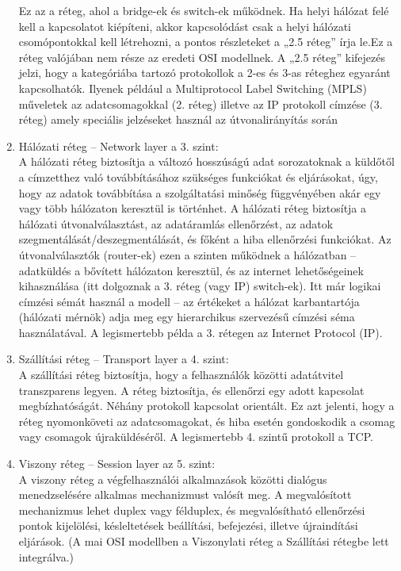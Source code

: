 \documentclass[12pt, a4paper]{article}
\begin{document}
\begin{enumerate}
Ez az a réteg, ahol a bridge-ek és switch-ek működnek. Ha helyi hálózat felé kell a kapcsolatot kiépíteni, akkor kapcsolódást csak a helyi hálózati csomópontokkal kell létrehozni, a pontos részleteket a „2.5 réteg” írja le.Ez a réteg valójában nem része az eredeti OSI modellnek. A „2.5 réteg” kifejezés jelzi, hogy a kategóriába tartozó protokollok a 2-es és 3-as réteghez egyaránt kapcsolhatók. Ilyenek például a Multiprotocol Label Switching (MPLS) műveletek az adatcsomagokkal (2. réteg) illetve az IP protokoll címzése (3. réteg) amely speciális jelzéseket használ az útvonalirányítás során
\item
Hálózati réteg – Network layer a 3. szint:\\
A hálózati réteg biztosítja a változó hosszúságú adat sorozatoknak a küldőtől a címzetthez való továbbításához szükséges funkciókat és eljárásokat, úgy, hogy az adatok továbbítása a szolgáltatási minőség függvényében akár egy vagy több hálózaton keresztül is történhet. A hálózati réteg biztosítja a hálózati útvonalválasztást, az adatáramlás ellenőrzést, az adatok szegmentálását/deszegmentálását, és főként a hiba ellenőrzési funkciókat. Az útvonalválasztók (router-ek) ezen a szinten működnek a hálózatban – adatküldés a bővített hálózaton keresztül, és az internet lehetőségeinek kihasználása (itt dolgoznak a 3. réteg (vagy IP) switch-ek). Itt már logikai címzési sémát használ a modell – az értékeket a hálózat karbantartója (hálózati mérnök) adja meg egy hierarchikus szervezésű címzési séma használatával. A legismertebb példa a 3. rétegen az Internet Protocol (IP).
\item
Szállítási réteg – Transport layer a 4. szint:\\
A szállítási réteg biztosítja, hogy a felhasználók közötti adatátvitel transzparens legyen. A réteg biztosítja, és ellenőrzi egy adott kapcsolat megbízhatóságát. Néhány protokoll kapcsolat orientált. Ez azt jelenti, hogy a réteg nyomonköveti az adatcsomagokat, és hiba esetén gondoskodik a csomag vagy csomagok újraküldéséről. A legismertebb 4. szintű protokoll a TCP.
\item
Viszony réteg – Session layer az 5. szint:\\
A viszony réteg a végfelhasználói alkalmazások közötti dialógus menedzselésére alkalmas mechanizmust valósít meg. A megvalósított mechanizmus lehet duplex vagy félduplex, és megvalósítható ellenőrzési pontok kijelölési, késleltetések beállítási, befejezési, illetve újraindítási eljárások.
 (A mai OSI modellben a Viszonylati réteg a Szállítási rétegbe lett integrálva.)

\end{enumerate}
\end{document}
